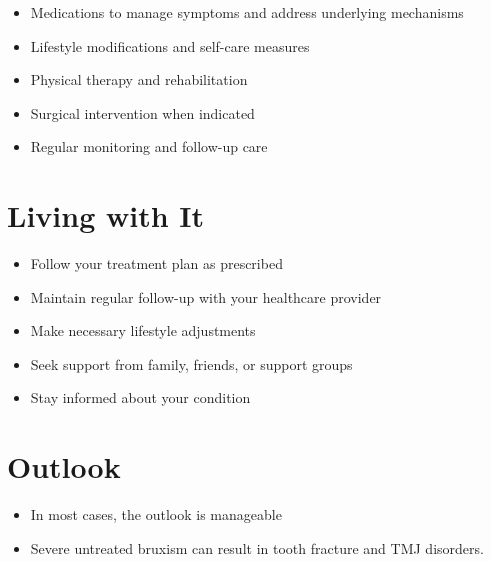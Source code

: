 \begin{itemize}[noitemsep]
  \item Medications to manage symptoms and address underlying mechanisms
  \item Lifestyle modifications and self-care measures
  \item Physical therapy and rehabilitation
  \item Surgical intervention when indicated
  \item Regular monitoring and follow-up care
\end{itemize}
\section{Living with It}
\begin{itemize}[noitemsep]
  \item Follow your treatment plan as prescribed
  \item Maintain regular follow-up with your healthcare provider
  \item Make necessary lifestyle adjustments
  \item Seek support from family, friends, or support groups
  \item Stay informed about your condition
\end{itemize}
\section{Outlook}
\begin{itemize}[noitemsep]
  \item In most cases, the outlook is manageable
  \item Severe untreated bruxism can result in tooth fracture and TMJ disorders.
\end{itemize}
